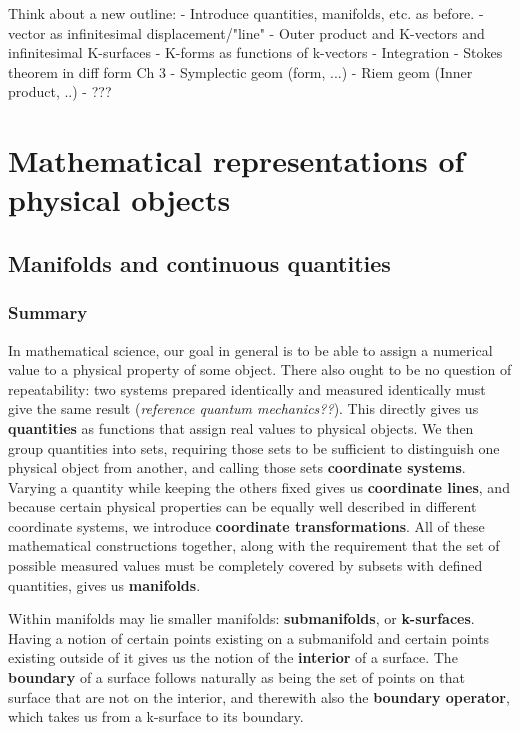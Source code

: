 \documentclass{book}
\begin{document}
\tableofcontents


Think about a new outline: 
- Introduce quantities, manifolds, etc. as before. 
- vector as infinitesimal displacement/"line"
- Outer product and K-vectors and infinitesimal K-surfaces
- K-forms as functions of k-vectors
- Integration
- Stokes theorem in diff form
Ch 3
- Symplectic geom (form, ...)
- Riem geom (Inner product, ..)
- ???


\chapter{Mathematical representations of physical objects}


\section{Manifolds and continuous quantities}

\subsection{Summary}

In mathematical science, our goal in general is to be able to assign a numerical value to a physical property of some object. There also ought to be no question of repeatability: two systems prepared identically and measured identically must give the same result (\emph{reference quantum mechanics??}). This directly gives us \textbf{quantities} as functions that assign real values to physical objects. We then group quantities into sets, requiring those sets to be sufficient to distinguish one physical object from another, and calling those sets \textbf{coordinate systems}. Varying a quantity while keeping the others fixed gives us \textbf{coordinate lines}, and because certain physical properties can be equally well described in different coordinate systems, we introduce \textbf{coordinate transformations}. All of these mathematical constructions together, along with the requirement that the set of possible measured values must be completely covered by subsets with defined quantities, gives us \textbf{manifolds}. 

Within manifolds may lie smaller manifolds: \textbf{submanifolds}, or \textbf{k-surfaces}. Having a notion of certain points existing on a submanifold and certain points existing outside of it gives us the notion of the \textbf{interior} of a surface. The \textbf{boundary} of a surface follows naturally as being the set of points on that surface that are not on the interior, and therewith also the \textbf{boundary operator}, which takes us from a k-surface to its boundary. 
\end{document}
